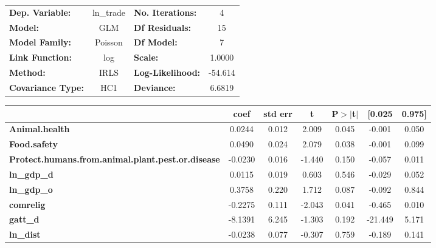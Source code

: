 \begin{center}
\begin{tabular}{lclc}
\toprule
\textbf{Dep. Variable:}                                   &   ln\_trade   & \textbf{  No. Iterations:    } &     4       \\
\textbf{Model:}                                           &      GLM      & \textbf{  Df Residuals:      } &     15      \\
\textbf{Model Family:}                                    &    Poisson    & \textbf{  Df Model:          } &     7       \\
\textbf{Link Function:}                                   &      log      & \textbf{  Scale:             } &    1.0000   \\
\textbf{Method:}                                          &      IRLS     & \textbf{  Log-Likelihood:    } &   -54.614   \\
\textbf{Covariance Type:}                                 &      HC1      & \textbf{  Deviance:          } &    6.6819   \\
\bottomrule
\end{tabular}
\begin{tabular}{lcccccc}
                                                          & \textbf{coef} & \textbf{std err} & \textbf{t} & \textbf{P$> |$t$|$} & \textbf{[0.025} & \textbf{0.975]}  \\
\midrule
\textbf{Animal.health}                                    &       0.0244  &        0.012     &     2.009  &         0.045        &       -0.001    &        0.050     \\
\textbf{Food.safety}                                      &       0.0490  &        0.024     &     2.079  &         0.038        &       -0.001    &        0.099     \\
\textbf{Protect.humans.from.animal.plant.pest.or.disease} &      -0.0230  &        0.016     &    -1.440  &         0.150        &       -0.057    &        0.011     \\
\textbf{ln\_gdp\_d}                                       &       0.0115  &        0.019     &     0.603  &         0.546        &       -0.029    &        0.052     \\
\textbf{ln\_gdp\_o}                                       &       0.3758  &        0.220     &     1.712  &         0.087        &       -0.092    &        0.844     \\
\textbf{comrelig}                                         &      -0.2275  &        0.111     &    -2.043  &         0.041        &       -0.465    &        0.010     \\
\textbf{gatt\_d}                                          &      -8.1391  &        6.245     &    -1.303  &         0.192        &      -21.449    &        5.171     \\
\textbf{ln\_dist}                                         &      -0.0238  &        0.077     &    -0.307  &         0.759        &       -0.189    &        0.141     \\
\bottomrule
\end{tabular}
\end{center}